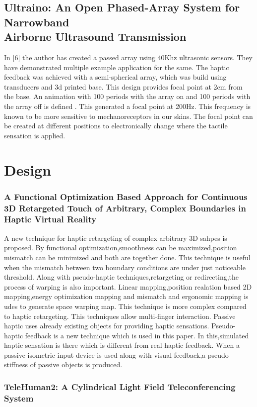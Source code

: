 \documentclass{fisatproject}
\begin{document}
\section{\normalsize Ultraino: An Open Phased-Array System for Narrowband \\ Airborne Ultrasound Transmission}
\par In [6] the author has created a passed array using 40Khz ultrasonic sensors. They have demonstrated multiple example application for the same.
The haptic feedback was achieved with a semi-spherical array, which was build using transducers and 3d printed base. This design provides focal point at 2cm from the base.
An animation with 100 periods with the array on and 100 periods with  the  array  off is defined . This generated a focal point at 200Hz. This frequency is known to be more sensitive to mechanoreceptors in our skins. The focal point can be created at different positions to electronically  change  where  the  tactile  sensation  is  applied.
\chapter{Design}
\subsection{ 
  \normalsize  A Functional Optimization Based Approach for Continuous 3D Retargeted Touch of Arbitrary, Complex Boundaries in Haptic Virtual Reality
}
A new technique for haptic retargeting of complex arbitrary 3D sahpes is proposed.
By functional optimization,smoothness can be maximized,position mismatch can be minimized and both are together done.
This technique is useful when the mismatch between two boundary conditions are under just noticeable threshold.
Along with pseudo-haptic techniques,retargeting or redirecting,the process of warping is also important.
Linear mapping,position realation based 2D mapping,energy optimization mapping and mismatch and ergonomic mapping is udes to generate space warping map.
This technique is more complex compared to haptic retargeting.
This techniques allow multi-finger interaction.
Passive haptic uses already existing objects for providing haptic sensations.
Pseudo-haptic feedback is a new technique which is used in this paper.
In this,simulated haptic sensation is there which is different from real haptic feedback.
When a passive isometric input device is used along with visual feedback,a pseudo-stiffness of passive objects is produced. 
\subsection{ 
  \normalsize TeleHuman2: A Cylindrical Light Field Teleconferencing \\ System
}
\end{document}
